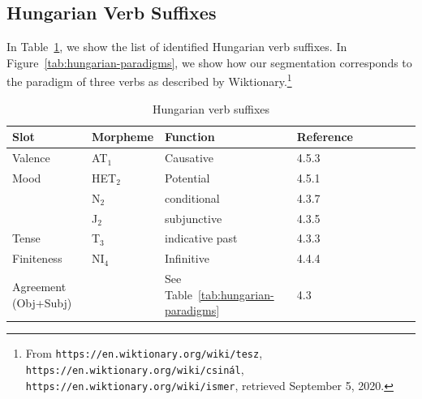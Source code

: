 \documentclass[11pt,letterpaper]{article}
\begin{document}
\subsection{Hungarian Verb Suffixes}


In Table~\ref{tab:hungarian-suffixes}, we show the list of identified Hungarian verb suffixes.
In Figure~\ref{tab:hungarian-paradigms}, we show how our segmentation corresponds to the paradigm of three verbs as described by Wiktionary.\footnote{From \texttt{https://en.wiktionary.org/wiki/tesz},
\texttt{https://en.wiktionary.org/wiki/csinál},
\texttt{https://en.wiktionary.org/wiki/ismer}, retrieved September 5, 2020.}





\begin{table}
    \centering
    \begin{tabular}{lllllllll}
    Slot & Morpheme & Function & Reference    \\ \hline\hline
Valence	    & AT$_1$ & Causative &   \cite{rounds2001hungarian} 4.5.3 \\ \hline
Mood	    & HET$_2$ & Potential &   \cite{rounds2001hungarian} 4.5.1  \\
         & N$_2$ & conditional &   \cite{rounds2001hungarian} 4.3.7 \\
         & J$_2$ & subjunctive &   \cite{rounds2001hungarian} 4.3.5 \\
\hline
	    Tense& T$_3$ & indicative past &  \cite{rounds2001hungarian} 4.3.3 \\
         \hline
Finiteness  & NI$_4$ & Infinitive  &  \cite{rounds2001hungarian} 4.4.4 \\
\hline
Agreement (Obj+Subj)         & & See Table~\ref{tab:hungarian-paradigms} & \cite{rounds2001hungarian} 4.3 \\
         \hline
    \end{tabular}
    \caption{Hungarian verb suffixes}
    \label{tab:hungarian-suffixes}
\end{table}
\end{document}
